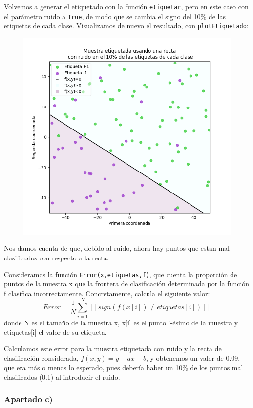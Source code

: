 \documentclass[a4]{article}
\begin{document}
Volvemos a generar el etiquetado con la función \lstinline|etiquetar|, pero en este caso con el parámetro ruido a \lstinline|True|, de modo que se cambia el signo  del 10\% de las etiquetas de cada clase. Visualizamos de nuevo el resultado, con \lstinline|plotEtiquetado|:

\begin{figure}[H]
	\centering
	\includegraphics[width=0.65\linewidth]{img/recta_ruido}
	\caption{}
	\label{fig:recta_ruido}
\end{figure}

Nos damos cuenta de que, debido al ruido, ahora hay puntos que están mal clasificados con respecto a la recta. 

Consideramos la función \lstinline|Error(x,etiquetas,f)|, que cuenta la proporción de puntos de la muestra x que la frontera de clasificación determinada por la función f clasifica incorrectamente. Concretamente, calcula el siguiente valor:
$$Error=\frac{1}{N}\sum_{i=1}^{N}[[sign(f(x[i])\neq etiquetas[i])]]$$ donde N es el tamaño de la muestra x, x[i] es el punto i-ésimo de la muestra y etiquetas[i] el valor de su etiqueta. 

Calculamos este error para la muestra etiquetada con ruido y la recta de clasificación considerada, $f(x,y)=y-ax-b$, y obtenemos un valor de 0.09, que era más o menos lo esperado, pues debería haber un 10\% de los puntos mal clasificados (0.1) al introducir el ruido. 
\newpage
\subsubsection{Apartado c)}
\end{document}
